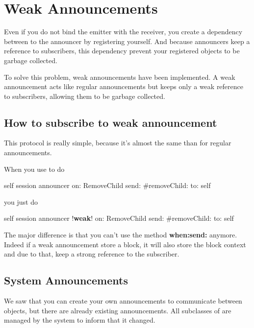 \documentclass[a4paper,10pt,twoside]{book}
\begin{document}


\section{Weak Announcements}

Even if you do not bind the emitter with the receiver, you create a dependency between to the announcer by registering yourself. And because announcers keep a reference to subscribers, this dependency prevent your registered objects to be garbage collected.

To solve this problem, weak announcements have been implemented. A weak announcement acts like regular announcements but keeps only a weak reference to subscribers, allowing them to be garbage collected.

\subsection{How to subscribe to weak announcement}

This protocol is really simple, because it's almost the same than for regular announcements.

When you use to do

\begin{code}{}
self session announcer on: RemoveChild send: #removeChild: to: self
\end{code}

you just do

\begin{code}{}
self session announcer !\textbf{weak}! on: RemoveChild send: #removeChild: to: self
\end{code}

The major difference is that you can't use the method \textbf{when:send:} anymore. Indeed if a weak announcement store a block, it will also store the block context and due to that, keep a strong reference to the subscriber.

\subsection{System Announcements}

We saw that you can create your own announcements to communicate between objects, but there are already existing announcements. All subclasses of  are managed by the system to inform that it changed.
\end{document}
